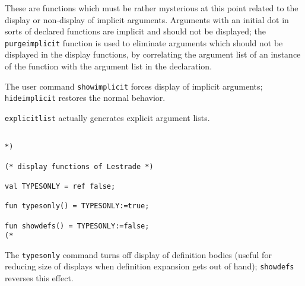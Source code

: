 \documentclass{article}
\begin{document}
These are functions which must be rather mysterious at this point related to the display or non-display of implicit arguments.  Arguments with an initial dot
in sorts of declared functions are implicit and should not be displayed; the {\tt purgeimplicit} function is used to eliminate arguments which should not be displayed in
the display functions, by correlating the argument list of an instance of the function with the argument list in the declaration.

The user command {\tt showimplicit} forces display of implicit arguments;  {\tt hideimplicit} restores the normal behavior.

{\tt explicitlist} actually generates explicit argument lists.

\begin{verbatim}

*)

(* display functions of Lestrade *)

val TYPESONLY = ref false;

fun typesonly() = TYPESONLY:=true;

fun showdefs() = TYPESONLY:=false;
(*
\end{verbatim}

The {\tt typesonly} command turns off display of definition bodies (useful for reducing size of displays when definition expansion gets out of hand);
{\tt showdefs} reverses this effect.
\end{document}

